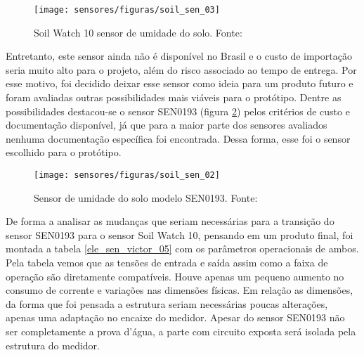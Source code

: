		\begin{figure}[H]
			\centering
			\texttt{[image: sensores/figuras/soil\_sen\_03]}
			\caption{Soil Watch 10 sensor de umidade do solo. Fonte: \cite{bib_soil_sen_03}}
			\label{soil_sen_03}
		\end{figure}	

		Entretanto, este sensor ainda não é disponível no Brasil e o custo de importação seria muito alto para o projeto, além do risco associado ao tempo de entrega. Por esse motivo, foi decidido deixar esse sensor como ideia para um produto futuro e foram avaliadas outras possibilidades mais viáveis para o protótipo. Dentre as possibilidades destacou-se o sensor SEN0193 (figura \ref{soil_sen_02}) pelos critérios de custo e documentação disponível, já que para a maior parte dos sensores avaliados nenhuma documentação específica foi encontrada. Dessa forma, esse foi o sensor escolhido para o protótipo.
		
		\begin{figure}[H]
			\centering
			\texttt{[image: sensores/figuras/soil\_sen\_02]}
			\caption{Sensor de umidade do solo modelo SEN0193. Fonte: \cite{bib_soil_sen_02}}
			\label{soil_sen_02}
		\end{figure}	
		
		De forma a analisar as mudanças que seriam necessárias para a transição do sensor SEN0193 para o sensor Soil Watch 10, pensando em um produto final, foi montada a tabela \ref{ele_sen_victor_05} com os parâmetros operacionais de ambos. Pela tabela vemos que as tensões de entrada e saída assim como a faixa de operação são diretamente compatíveis. Houve apenas um pequeno aumento no consumo de corrente e variações nas dimensões físicas. Em relação as dimensões, da forma que foi pensada a estrutura seriam necessárias poucas alterações, apenas uma adaptação no encaixe do medidor. Apesar do sensor SEN0193 não ser completamente a prova d'água, a parte com circuito exposta será isolada pela estrutura do medidor.

